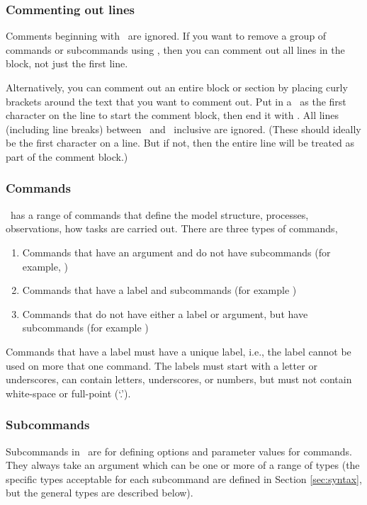 \subsubsection{Commenting out lines}

Comments beginning with \commentline\ are ignored. If you want to remove a group of commands or subcommands using \commentline, then you can comment out all lines in the block, not just the first line. 

Alternatively, you can comment out an entire block or section by placing curly brackets around the text that you want to comment out. Put in a \commentstart\ as the first character on the line to start the comment block, then end it with \commentend. All lines (including line breaks) between \commentstart\ and \commentend\ inclusive are ignored. (These should ideally be the first character on a line. But if not, then the entire line will be treated as part of the comment block.)

\subsubsection{Commands}

\SPM\ has a range of commands that define the model structure, processes, observations, how tasks are carried out. There are three types of commands, 
\begin{enumerate}
\item Commands that have an argument and do not have subcommands (for example, )
\item Commands that have a label and subcommands (for example )
\item Commands that do not have either a label or argument, but have subcommands (for example )
\end{enumerate}

Commands that have a label must have a unique label, i.e., the label cannot be used on more that one command. The labels must start with a letter or underscores, can contain letters, underscores, or numbers, but must not contain white-space or full-point (`.').

\subsubsection{Subcommands}

Subcommands in \SPM\ are for defining options and parameter values for commands. They always take an argument which can be one or more of a range of types (the specific types acceptable for each subcommand are defined in Section \ref{sec:syntax}, but the general types are described below). 

